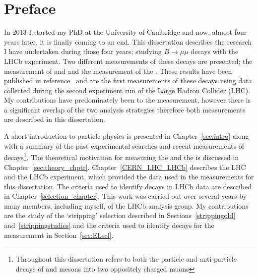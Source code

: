 \chapter{Preface}

In 2013 I started my PhD at the University of Cambridge and now, almost four years later, it is finally coming to an end. This dissertation describes the research I have undertaken during those four years; studying $B \to \mu \mu$ decays with the LHCb experiment. Two different measurements of these decays are presented; the measurement of \bdmumu and \bsmumu \BFs and the measurement of the \bsmumu \el. These results have been published in reference~\cite{Aaij:2017vad} and are the first measurements of these decays using data collected during the second experiment run of the Large Hadron Collider (LHC). My contributions have predominately been to the \el measurement, however there is a significant overlap of the two analysis strategies therefore both measurements are described in this dissertation.

A short introduction to particle physics is presented in Chapter~\ref{sec:intro} along with a summary of the past experimental searches and recent measurements of \bmumu decays\footnote{Throughout this dissertation \bmumu refers to both the particle and anti-particle decays of \bd and \bs mesons into two oppositely charged muons}. The theoretical motivation for measuring the \bmumu \BFs and the \bsmumu \el is discussed in Chapter~\ref{sec:theory_chptr}.
Chapter~\ref{CERN_LHC_LHCb} describes the LHC and the LHCb experiment, which provided the data used in the measurements for this dissertation.
The criteria used to identify \bmumu decays in LHCb data are described in Chapter~\ref{selection_chapter}. This work was carried out over several years by many members, including myself, of the \bmumu LHCb analysis group. My contributions are the study of the `stripping' selection described in Sections~\ref{strippingold} and~\ref{strippingstudies} and the criteria used to identify \bsmumu decays for the \el measurement in Section~\ref{sec:ELsel}.

